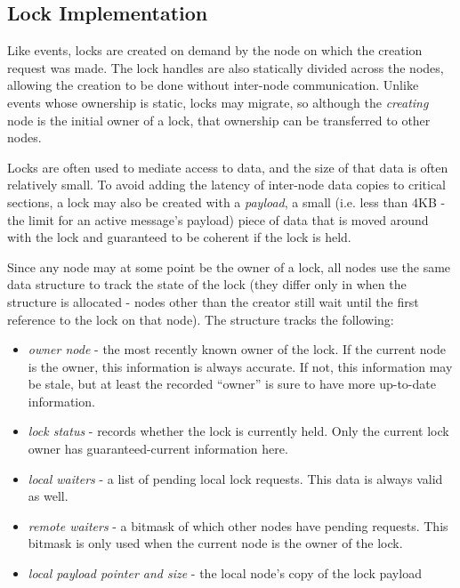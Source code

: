 \subsection{Lock Implementation}
\label{subsec:lockimpl}

Like events, locks are created on demand by the node on which the creation request was made.  The lock
handles are also statically divided across the nodes, allowing the creation to be done without inter-node
communication.  Unlike events whose ownership is static, locks may migrate, so although the {\em creating}
node is the initial owner of a lock, that ownership can be transferred to other nodes.

Locks are often used to mediate access to data, and the size of that data is often relatively small.  To
avoid adding the latency of inter-node data copies to critical sections, a lock may also be created with a
{\em payload}, a small (i.e. less than 4KB - the limit for an active message's payload) piece of data that is moved around with the lock and guaranteed to be coherent if
the lock is held.

Since any node may at some point be the owner of a lock, all nodes use the same data structure to track the
state of the lock (they differ only in when the structure is allocated -
nodes other than the creator still wait until the first reference to the lock on that node).  The structure
tracks the following:
\begin{itemize}
\item {\em owner node} - the most recently known owner of the lock.  If the current node is the owner, this
information is always accurate.  If not, this information may be stale, but at least the recorded ``owner''
is sure to have more up-to-date information.
\item {\em lock status} - records whether the lock is currently held.  Only the current lock owner has
guaranteed-current information here.
\item {\em local waiters} - a list of pending local lock requests.  This data is always valid as well.
\item {\em remote waiters} - a bitmask of which other nodes have pending requests.  This bitmask is only
used when the current node is the owner of the lock.
\item {\em local payload pointer and size} - the local node's copy of the lock payload
\end{itemize}

